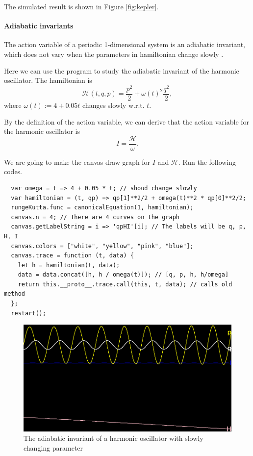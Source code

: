 \documentclass[12pt]{article}
\begin{document}
The simulated result is shown in Figure \ref{fig:kepler}.

\paragraph{Adiabatic invariants}

The action variable of a periodic 1-dimensional system is an adiabatic invariant,
which does not vary when the parameters in hamiltonian change slowly \cite[p. 298]{arnold1989mathmech}\cite[p. 156]{landau1976mechanics}.

Here we can use the program to study the adiabatic invariant of the harmonic oscillator.
The hamiltonian is
\begin{equation*}
  \mathcal H\left(t,q,p\right)=\frac{p^2}2+\omega\left(t\right)^2\frac{q^2}2,
\end{equation*}
where $\omega\left(t\right):=4+0.05t$ changes slowly w.r.t. $t$.

By the definition of the action variable,
we can derive that the action variable for the harmonic oscillator is \cite[p. 300]{arnold1989mathmech}\cite[p. 157]{landau1976mechanics}
\begin{equation*}
  I=\frac{\mathcal H}\omega.
\end{equation*}

We are going to make the canvas draw graph for $I$ and $\mathcal H$.
Run the following codes.

\begin{verbatim}
  var omega = t => 4 + 0.05 * t; // shoud change slowly
  var hamiltonian = (t, qp) => qp[1]**2/2 + omega(t)**2 * qp[0]**2/2;
  rungeKutta.func = canonicalEquation(1, hamiltonian);
  canvas.n = 4; // There are 4 curves on the graph
  canvas.getLabelString = i => 'qpHI'[i]; // The labels will be q, p, H, I
  canvas.colors = ["white", "yellow", "pink", "blue"];
  canvas.trace = function (t, data) {
    let h = hamiltonian(t, data);
    data = data.concat([h, h / omega(t)]); // [q, p, h, h/omega]
    return this.__proto__.trace.call(this, t, data); // calls old method
  };
  restart();
\end{verbatim}

\begin{figure}[h]
  \centering
  \includegraphics[width=0.6\linewidth]{adiabatic.png}
  \caption{The adiabatic invariant of a harmonic oscillator with slowly changing parameter}
  \label{fig:adiabatic}
\end{figure}
\end{document}
